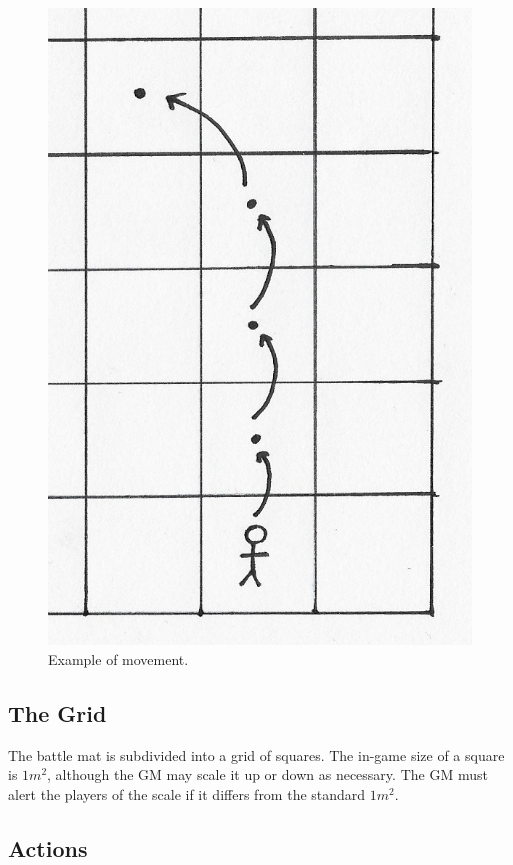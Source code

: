 \begin{figure}
    \centering
    \includegraphics{graphics/movement.png}
    \caption{Example of movement.}
    \label{fig:movement}
\end{figure}

\subsection{The Grid}
The battle mat is subdivided into a grid of squares. 
The in-game size of a square is $1m^2$, although the GM may scale it up or down as necessary.
The GM must alert the players of the scale if it differs from the standard $1m^2$.

\subsection{Actions}
